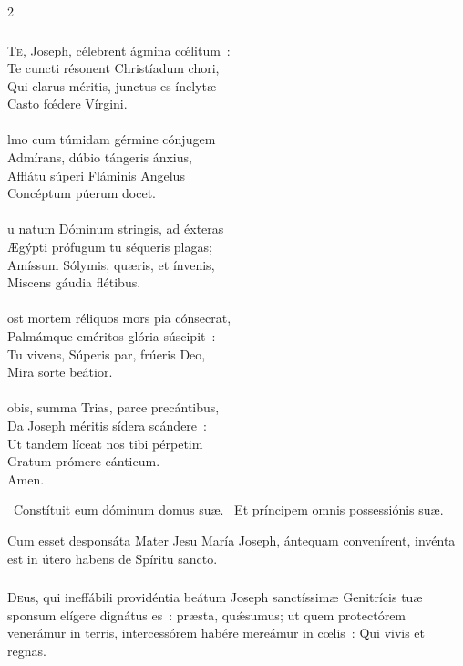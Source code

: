 \documentclass[9pt,twoside]{extarticle}
\begin{document}
\begin{multicols}{2}
{{{\subsubsection*{\center {}}
\lettrine{T}e, Joseph, célebrent ágmina cœ́litum~:\\
Te cuncti résonent Christíadum chori,\\
Qui clarus méritis, junctus es ínclytæ\\
Casto fœ́dere Vírgini.\\
\\
lmo cum túmidam gérmine cónjugem\\
Admírans, dúbio tángeris ánxius,\\
Afflátu súperi Fláminis Angelus\\
Concéptum púerum docet.\\
\\
u natum Dóminum stringis, ad éxteras\\
Ægýpti prófugum tu séqueris plagas;\\
Amíssum Sólymis, quæris, et ínvenis,\\
Miscens gáudia flétibus.\\
\\
ost mortem réliquos mors pia cónsecrat,\\
Palmámque eméritos glória súscipit~:\\
Tu vivens, Súperis par, frúeris Deo,\\
Mira sorte beátior.\\
\\
obis, summa Trias, parce precántibus,\\
Da Joseph méritis sídera scándere~:\\
Ut tandem líceat nos tibi pérpetim\\
Gratum prómere cánticum.\\
Amen.

\begin{tightlist}{}
\item {}~Constítuit eum dóminum domus suæ. ~Et príncipem omnis possessiónis suæ.
\item {} Cum esset desponsáta Mater Jesu María Joseph, ántequam convenírent, invénta est in útero habens de Spíritu sancto.
\end{tightlist}

\subsubsection*{\center {}}
\lettrine{D}eus, qui ineffábili providéntia beátum Joseph sanctíssimæ Genitrícis tuæ sponsum elígere dignátus es~: præsta, quǽsumus; ut quem protectórem venerámur in terris, intercessórem habére mereámur in cœlis~: Qui vivis et regnas.

}}}
\end{multicols}
\end{document}
